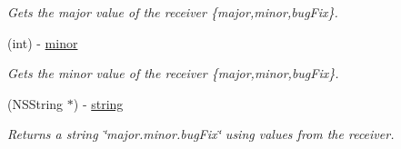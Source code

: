 \begin{CompactItemize}
\begin{CompactList}\small\item\em Gets the major value of the receiver \{major,minor,bugFix\}. \item\end{CompactList}\item 
(int) - \hyperlink{interface_s_s_y_version_triplet_24cfe844258de7623aa2d977e3569aa6}{minor}
\begin{CompactList}\small\item\em Gets the minor value of the receiver \{major,minor,bugFix\}. \item\end{CompactList}\item 
(NSString $\ast$) - \hyperlink{interface_s_s_y_version_triplet_b3561f24707f66e4829df0ca7a6e7c65}{string}
\begin{CompactList}\small\item\em Returns a string \char`\"{}major.minor.bugFix\char`\"{} using values from the receiver. \item\end{CompactList}\end{CompactItemize}
